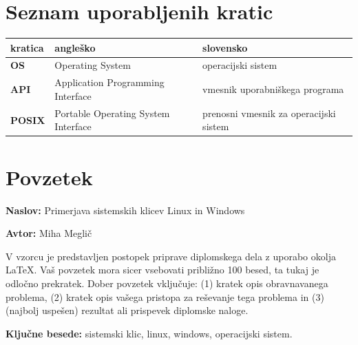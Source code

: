 \documentclass[a4paper,12pt,openright]{book}
\newcommand{\ttitle}{Primerjava sistemskih klicev Linux in Windows}
\newcommand{\tauthor}{Miha Meglič}
\newcommand{\tkeywords}{sistemski klic, linux, windows, operacijski sistem}
\newcommand{\clearemptydoublepage}{\newpage{\pagestyle{empty}\cleardoublepage}}
\begin{document}
\pagestyle{empty}
\def\thepage{}%
\tableofcontents{}


\clearemptydoublepage


\chapter*{Seznam uporabljenih kratic}

\noindent\begin{tabular}{p{}|p{}|p{}}    %
{\bf kratica} & {\bf angleško}                     & {\bf slovensko}                        \\
\hline
{\bf OS}      & Operating System                    & operacijski sistem                     \\
{\bf API}     & Application Programming Interface   & vmesnik uporabniškega programa        \\
{\bf POSIX}   & Portable Operating System Interface & prenosni vmesnik za operacijski sistem \\
\end{tabular}


\clearemptydoublepage

\chapter*{Povzetek}

\noindent\textbf{Naslov:} \ttitle
\bigskip

\noindent\textbf{Avtor:} \tauthor
\bigskip

\noindent V vzorcu je predstavljen postopek priprave diplomskega dela z uporabo okolja \LaTeX. Vaš povzetek mora sicer vsebovati približno 100 besed, ta tukaj je odločno prekratek.
Dober povzetek vključuje: (1) kratek opis obravnavanega problema, (2) kratek opis vašega pristopa za reševanje tega problema in (3) (najbolj uspešen) rezultat ali prispevek diplomske naloge.

\bigskip

\noindent\textbf{Ključne besede:} \tkeywords.
\clearemptydoublepage
\end{document}

